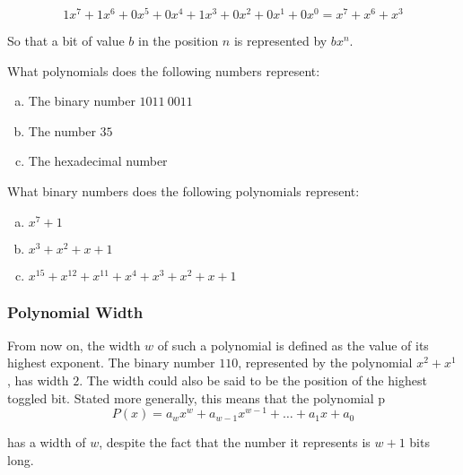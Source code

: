 \begin{equation*}
  1x^7 + 1x^6 + 0x^5 + 0x^4 + 1x^3 + 0x^2 + 0x^1 + 0x^0 = x^7 + x^6 + x^3
\end{equation*}

So that a bit of value $b$ in the position $n$ is represented by
$bx^n$.

\begin{Exercise}[label={bin-to-poly}]

  What polynomials does the following numbers represent:

  \begin{enumerate}[(a)]
  \item The binary number $1011\ 0011$
  \item The number $35$
  \item The hexadecimal number 
  \end{enumerate}

\end{Exercise}

\begin{Exercise}[label={poly-to-bin}]

  What binary numbers does the following polynomials represent:

  \begin{enumerate}[(a)]
  \item $x^7 + 1$
  \item $x^3 + x^2 + x + 1$
  \item $x^{15} + x^{12} + x^{11} + x^4 + x^3 + x^2 + x + 1$
  \end{enumerate}

\end{Exercise}

\subsubsection{Polynomial Width}

From now on, the width $w$ of such a polynomial is defined as the
value of its highest exponent. The binary number $110$, represented by
the polynomial $x^2 + x^1$, has width $2$. The width could also be
said to be the position of the highest toggled bit. Stated more
generally, this means that the polynomial p
\begin{equation*}
  P(x) = a_wx^w + a_{w-1}x^{w-1} + \dots + a_{1}x + a_{0}
\end{equation*}

has a width of $w$, despite the fact that the number it represents is
$w + 1$ bits long.

